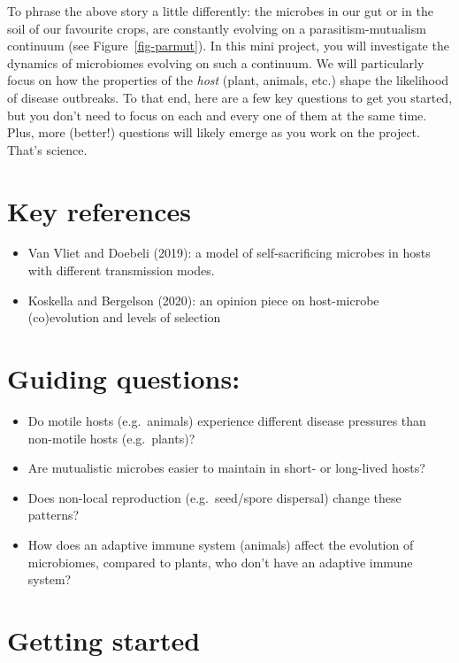 \documentclass[
  letterpaper,
  DIV=11,
  numbers=noendperiod]{scrreprt}
\providecommand{\tightlist}{%
  \setlength{\itemsep}{0pt}\setlength{\parskip}{0pt}}\usepackage{longtable,booktabs,array}
\theoremstyle{definition}
\theoremstyle{remark}
\begin{document}
To phrase the above story a little differently: the microbes in our gut
or in the soil of our favourite crops, are constantly evolving on a
parasitism-mutualism continuum (see Figure~\ref{fig-parmut}). In this
mini project, you will investigate the dynamics of microbiomes evolving
on such a continuum. We will particularly focus on how the properties of
the \emph{host} (plant, animals, etc.) shape the likelihood of disease
outbreaks. To that end, here are a few key questions to get you started,
but you don't need to focus on each and every one of them at the same
time. Plus, more (better!) questions will likely emerge as you work on
the project. That's science.

\section{Key references}\label{key-references}

\begin{itemize}
\tightlist
\item
  Van Vliet and Doebeli (2019): a model of self-sacrificing microbes in
  hosts with different transmission modes.
\item
  Koskella and Bergelson (2020): an opinion piece on host-microbe
  (co)evolution and levels of selection
\end{itemize}

\section{Guiding questions:}\label{guiding-questions}

\begin{itemize}
\tightlist
\item
  Do motile hosts (e.g.~animals) experience different disease pressures
  than non-motile hosts (e.g.~plants)?
\item
  Are mutualistic microbes easier to maintain in short- or long-lived
  hosts?
\item
  Does non-local reproduction (e.g.~seed/spore dispersal) change these
  patterns?
\item
  How does an adaptive immune system (animals) affect the evolution of
  microbiomes, compared to plants, who don't have an adaptive immune
  system?
\end{itemize}

\section{Getting started}\label{getting-started}
\end{document}
